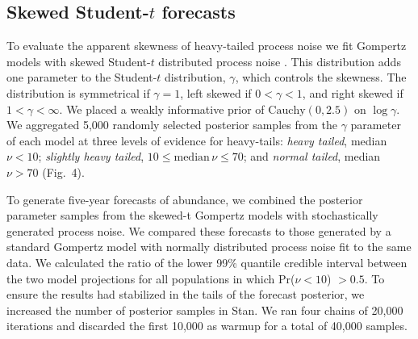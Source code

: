 \documentclass[9pt,twocolumn,twoside]{pnas-new}
\begin{document}
{\subsection{Skewed Student-$t$ forecasts} To evaluate the apparent skewness
of heavy-tailed process noise we fit Gompertz models with skewed Student-$t$
distributed process noise \cite{fernandez1998}. This distribution adds one
parameter to the Student-$t$ distribution, \(\gamma\), which controls the
skewness. The distribution is symmetrical if \(\gamma = 1\), left skewed if \(0
< \gamma < 1\), and right skewed if \(1 < \gamma < \infty\). We placed a weakly
informative prior of \(\mathrm{Cauchy}(0, 2.5)\) on \(\log \gamma\). We
aggregated 5,000 randomly selected posterior samples from the \(\gamma\)
parameter of each model at three levels of evidence for heavy-tails:
\emph{heavy tailed}, median \(\nu < 10\); \emph{slightly heavy tailed}, \(10 \le
\mathrm{median}\, \nu \le 70\); and \emph{normal tailed}, median \(\nu > 70\)
(Fig.~4).

To generate five-year forecasts of abundance, we combined the posterior
parameter samples from the skewed-t Gompertz models with stochastically
generated process noise. We compared these forecasts to those generated by a
standard Gompertz model with normally distributed process noise fit to the same
data. We calculated the ratio of the lower 99\% quantile credible interval
between the two model projections for all populations in which Pr(\(\nu < 10\))
\(> 0.5\). To ensure the results had stabilized in the tails of the forecast
posterior, we increased the number of posterior samples in Stan. We ran four
chains of 20,000 iterations and discarded the first 10,000 as warmup for a
total of 40,000 samples.



}

\showmatmethods %


\showacknow %

\pnasbreak


\end{document}
